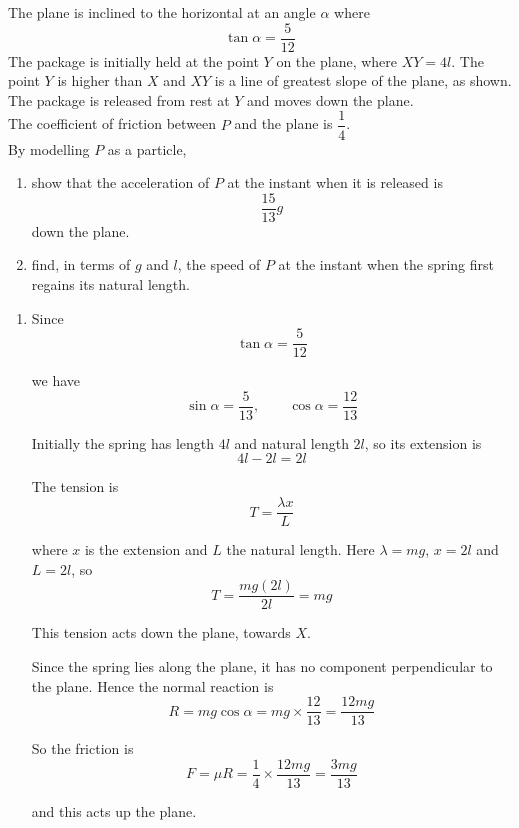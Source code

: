 \documentclass[leqno]{article}
\begin{document}
\begin{enumerate}[
  label=\textbf{\arabic*.},
  leftmargin=*,
  topsep=0pt,
  partopsep=0pt,
  parsep=0pt
]
The plane is inclined to the horizontal at an angle $\alpha$ where
\[
\tan \alpha = \dfrac{5}{12}
\] 
The package is initially held at the point $Y$ on the plane, where $XY = 4l$. The point $Y$ is higher than $X$ and $XY$ is a line of greatest slope of the plane, as shown. The package is released from rest at $Y$ and moves down the plane. \\

The coefficient of friction between $P$ and the plane is $\dfrac{1}{4}$. \\

By modelling $P$ as a particle, \\
\begin{enumerate}[label=\textbf{(\alph*)}]
  \item show that the acceleration of $P$ at the instant when it is released is
  \[
  \dfrac{15}{13}g
  \]
  down the plane.  \\
  \item find, in terms of $g$ and $l$, the speed of $P$ at the instant when the spring first regains its natural length.  
\end{enumerate}

\vspace*{10pt}

\begin{djsSolution}
\begin{enumerate}[label=\textbf{(\alph*)}, start=1]
  \item Since
  \[
  \tan\alpha=\frac{5}{12}
  \]

  we have
  \[
  \sin\alpha=\frac{5}{13},\qquad \cos\alpha=\frac{12}{13}
  \]

  Initially the spring has length $4l$ and natural length $2l$, so its extension is
  \[
  4l-2l=2l
  \]

  The tension is
  \[
  T=\frac{\lambda x}{L}
  \]

  where \(x\) is the extension and \(L\) the natural length. Here \(\lambda=mg\), \(x=2l\) and \(L=2l\), so
  \[
  T=\frac{mg(2l)}{2l}=mg
  \]

  This tension acts down the plane, towards $X$.

  Since the spring lies along the plane, it has no component perpendicular to the plane. Hence the normal reaction is
  \[
  R=mg\cos\alpha=mg\times\frac{12}{13}=\frac{12mg}{13}
  \]

  So the friction is
  \[
  F=\mu R=\frac14\times\frac{12mg}{13}=\frac{3mg}{13}
  \]

  and this acts up the plane.


\end{enumerate}
\end{djsSolution}
\end{enumerate}
\end{document}
